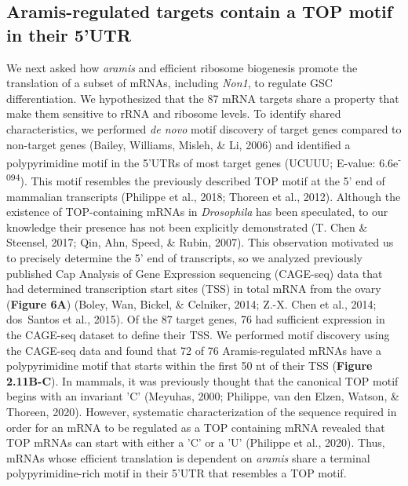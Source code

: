 \documentclass[12pt,oneside]{reedthesis}
\begin{document}
\hypertarget{aramis-regulated-targets-contain-a-top-motif-in-their-5utr}{%
\subsection{Aramis-regulated targets contain a TOP motif in their 5'UTR}\label{aramis-regulated-targets-contain-a-top-motif-in-their-5utr}}

We next asked how \emph{aramis} and efficient ribosome biogenesis promote the translation of a subset of mRNAs, including \emph{Non1}, to regulate GSC differentiation. We hypothesized that the 87 mRNA targets share a property that make them sensitive to rRNA and ribosome levels. To identify shared characteristics, we performed \emph{de novo} motif discovery of target genes compared to non-target genes (Bailey, Williams, Misleh, \& Li, 2006) and identified a polypyrimidine motif in the 5'UTRs of most target genes (UCUUU; E-value: 6.6e\textsuperscript{-094}). This motif resembles the previously described TOP motif at the 5' end of mammalian transcripts (Philippe et al., 2018; Thoreen et al., 2012). Although the existence of TOP-containing mRNAs in \emph{Drosophila} has been speculated, to our knowledge their presence has not been explicitly demonstrated (T. Chen \& Steensel, 2017; Qin, Ahn, Speed, \& Rubin, 2007). This observation motivated us to precisely determine the 5' end of transcripts, so we analyzed previously published Cap Analysis of Gene Expression sequencing (CAGE-seq) data that had determined transcription start sites (TSS) in total mRNA from the ovary (\textbf{Figure 6A}) (Boley, Wan, Bickel, \& Celniker, 2014; Z.-X. Chen et al., 2014; dos~Santos et al., 2015). Of the 87 target genes, 76 had sufficient expression in the CAGE-seq dataset to define their TSS. We performed motif discovery using the CAGE-seq data and found that 72 of 76 Aramis-regulated mRNAs have a polypyrimidine motif that starts within the first 50 nt of their TSS (\textbf{Figure 2.11B-C}). In mammals, it was previously thought that the canonical TOP motif begins with an invariant 'C' (Meyuhas, 2000; Philippe, van den Elzen, Watson, \& Thoreen, 2020). However, systematic characterization of the sequence required in order for an mRNA to be regulated as a TOP containing mRNA revealed that TOP mRNAs can start with either a 'C' or a 'U' (Philippe et al., 2020). Thus, mRNAs whose efficient translation is dependent on \emph{aramis} share a terminal polypyrimidine-rich motif in their 5'UTR that resembles a TOP motif.
\end{document}

